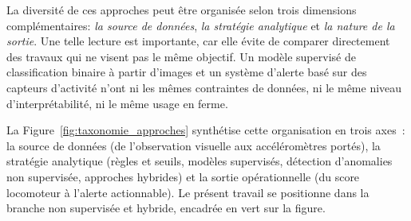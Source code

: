 La diversité de ces approches peut être organisée selon trois dimensions complémentaires:
\textit{la source de données}, \textit{la stratégie analytique} et \textit{la nature de la
sortie}. Une telle lecture est importante, car elle évite de comparer directement des travaux
qui ne visent pas le même objectif. Un modèle supervisé de classification binaire à partir
d'images et un système d'alerte basé sur des capteurs d'activité n'ont ni les mêmes
contraintes de données, ni le même niveau d'interprétabilité, ni le même usage en ferme.

La Figure~\ref{fig:taxonomie_approches} synthétise cette organisation en trois axes~: la
source de données (de l'observation visuelle aux accéléromètres portés), la stratégie
analytique (règles et seuils, modèles supervisés, détection d'anomalies non supervisée,
approches hybrides) et la sortie opérationnelle (du score locomoteur à l'alerte
actionnable). Le présent travail se positionne dans la branche non supervisée et hybride,
encadrée en vert sur la figure.

